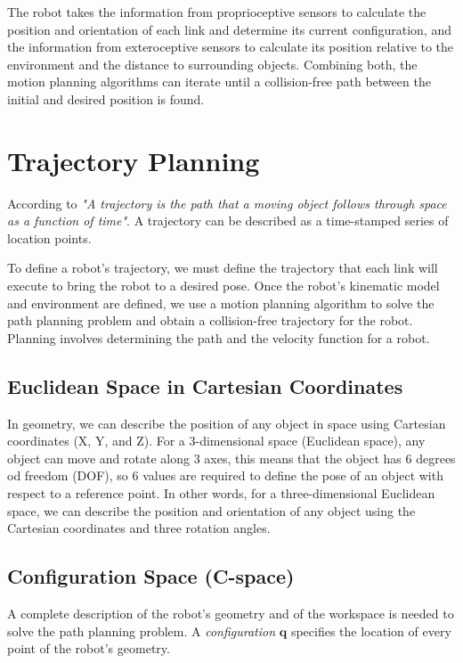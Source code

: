 The robot takes the information from proprioceptive sensors to calculate the position and orientation of each link and determine its current configuration, and the information from exteroceptive sensors to calculate its position relative to the environment and the distance to surrounding objects. Combining both, the motion planning algorithms can iterate until a collision-free path between the initial and desired position is found.

\section{Trajectory Planning}

According to \citet[chap. 1, page 6]{trajectory} \textit{"A trajectory is the path that a moving object follows through space as a function of time"}. A trajectory can be described as a time-stamped series of location points.

To define a robot's trajectory, we must define the trajectory that each link will execute to bring the robot to a desired pose. Once the robot's kinematic model and environment are defined, we use a motion planning algorithm to solve the path planning problem and obtain a collision-free trajectory for the robot. Planning involves determining the path and the velocity function for a robot. 

\subsection{Euclidean Space in Cartesian Coordinates}

In geometry, we can describe the position of any object in space using Cartesian coordinates (X, Y, and Z). For a 3-dimensional space (Euclidean space), any object can move and rotate along 3 axes, this means that the object has 6 degrees od freedom (DOF), so 6 values are required to define the pose of an object with respect to a reference point. In other words, for a three-dimensional Euclidean space, we can describe the position and orientation of any object using the Cartesian coordinates and three rotation angles.

\subsection{Configuration Space (C-space)}
\label{subsec:cspace}

A complete description of the robot's geometry and of the workspace is needed to solve the path planning problem. A \textit{configuration} $\bm{q}$ specifies the location of every point of the robot's geometry. 

